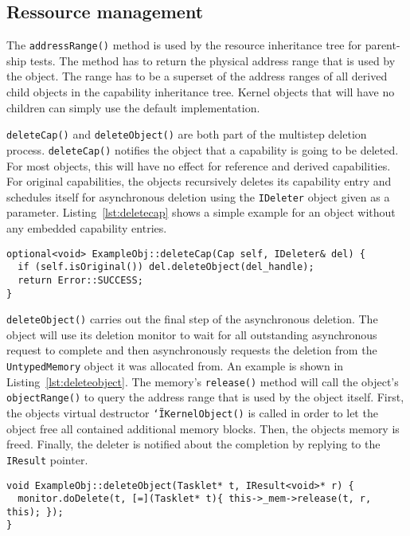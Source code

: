 \subsection{Ressource management}

The \texttt{addressRange()} method is used by the resource inheritance
tree for parent-ship tests. The method has to return the physical
address range that is used by the object. The range has to be a
superset of the address ranges of all derived child objects in the
capability inheritance tree. Kernel objects that will have no children
can simply use the default implementation.

\texttt{deleteCap()} and \texttt{deleteObject()} are both part of the
multistep deletion process. \texttt{deleteCap()} notifies the object
that a capability is going to be deleted. For most objects, this will
have no effect for reference and derived capabilities. For original
capabilities, the objects recursively deletes its capability entry and
schedules itself for asynchronous deletion using the \texttt{IDeleter}
object given as a parameter. Listing~\ref{lst:deletecap} shows a simple example
for an object without any embedded capability entries.

\begin{lstlisting}[float, label=lst:deletecap, caption=Example handler for capability revocation.]
optional<void> ExampleObj::deleteCap(Cap self, IDeleter& del) {
  if (self.isOriginal()) del.deleteObject(del_handle);
  return Error::SUCCESS;
}
\end{lstlisting}

\texttt{deleteObject()} carries out the final step of the asynchronous
deletion. The object will use its deletion monitor to wait for all
outstanding asynchronous request to complete and then asynchronously
requests the deletion from the \texttt{UntypedMemory} object it was
allocated from. An example is shown in
Listing~\ref{lst:deleteobject}. The memory's \texttt{release()} method
will call the object's \texttt{objectRange()} to query the address
range that is used by the object itself. First, the objects virtual
destructor \texttt{\char`\~IKernelObject()} is called in order to let the
object free all contained additional memory blocks. Then, the objects
memory is freed. Finally, the deleter is notified about the completion
by replying to the \texttt{IResult} pointer.

\begin{lstlisting}[float, label=lst:deleteobject, caption=Example handler for asynchronous object deletion.]
void ExampleObj::deleteObject(Tasklet* t, IResult<void>* r) {
  monitor.doDelete(t, [=](Tasklet* t){ this->_mem->release(t, r, this); });
}
\end{lstlisting}


